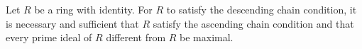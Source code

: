 Let $R$ be a ring with identity. For $R$ to satisfy the descending chain condition, it is necessary and sufficient that $R$ satisfy the ascending chain condition and that every prime ideal of $R$ different from $R$ be maximal.
